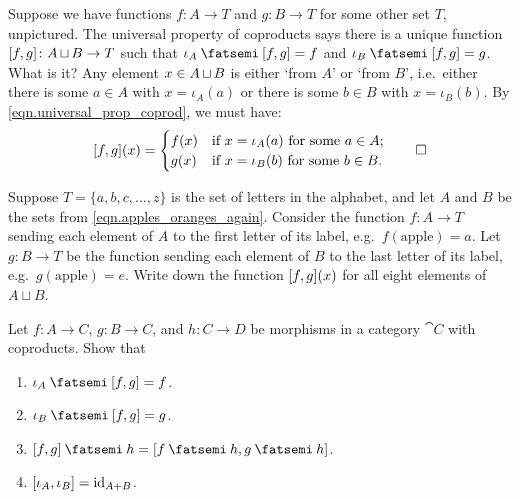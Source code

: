 \documentclass[7Sketches]{subfiles}
\begin{document}
\begin{example}
  Suppose we have functions $f\colon A \to T$ and $g\colon B \to T$ for some other set
  $T$, unpictured. The universal property of coproducts says there is a unique function $[f,g]\colon A\operatorname{\sqcup} B
  \to T$ such that $\iota_A\cp \copair{f,g} =f$ and $\iota_B \cp \copair{f,g} =g$. What is
  it? Any element $x\in A\operatorname{\sqcup} B$ is either `from $A$' or `from $B$', i.e.\ either there is some $a\in A$ with $x=\iota_A(a)$ or there is some $b\in B$ with $x=\iota_B(b)$. By \cref{eqn.universal_prop_coprod}, we must have:
  \[
    [f,g](x) = 
    \begin{cases}
      f(x) & \mbox{if } x=\iota_A(a) \mbox{ for some }a \in A; \\
      g(x) & \mbox{if } x=\iota_B(b) \mbox{ for some }b \in B.
    \end{cases}
    \qedhere
  \]
\end{example}

\begin{exercise} %
\label{exc.copairing}
	Suppose $T=\{a,b,c,\ldots,z\}$ is the set of letters in the alphabet,
	and let $A$ and $B$ be the sets from \cref{eqn.apples_oranges_again}.
	Consider the function $f\colon A\to T$ sending each element of $A$ to
	the first letter of its label, e.g.\ $f(\mathrm{apple})=a$. Let $g\colon
	B\to T$ be the function sending each element of $B$ to the last letter
	of its label, e.g.\ $g(\mathrm{apple})=e$. Write down the function
	$[f,g](x)$ for all eight elements of $A\sqcup B$.
\end{exercise}
  
\begin{exercise} %
\label{exc.coprod_properties}
  Let $f \colon A \to C$, $g \colon B \to C$, and $h\colon C \to D$ be morphisms
  in a category $\cat{C}$ with coproducts. Show that
  \begin{enumerate}
  \item $\iota_A \cp \copair{f,g} = f$.
  \item $\iota_B \cp \copair{f,g} = g$.
  \item $\copair{f,g}\cp h = \copair{f \cp h,g\cp h}$.
  \item $[\iota_A,\iota_B] = \mathrm{id}_{A+B}$.
  \qedhere
  \end{enumerate}
\end{exercise}
\end{document}
